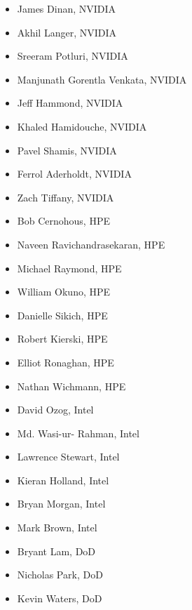 \begin{multicols}{2}
\begin{itemize}
\item James Dinan\footnotemark[1], NVIDIA                  %
\item Akhil Langer, NVIDIA                                 %
\item Sreeram Potluri, NVIDIA                              %
\item Manjunath Gorentla Venkata\footnotemark[10], NVIDIA  %
\item Jeff Hammond, NVIDIA                                 %
\item Khaled Hamidouche, NVIDIA                            %
\item Pavel Shamis, NVIDIA                                 %
\item Ferrol Aderholdt, NVIDIA                             %
\item Zach Tiffany, NVIDIA                                 %

\item Bob Cernohous, \ac{HPE}                              %
\item Naveen Ravichandrasekaran\footnotemark[9], \ac{HPE}  %
\item Michael Raymond, \ac{HPE}                            %
\item William Okuno\footnotemark[2], \ac{HPE}              %
\item Danielle Sikich, \ac{HPE}                            %
\item Robert Kierski, \ac{HPE}                             %
\item Elliot Ronaghan\footnotemark[8], \ac{HPE}            %
\item Nathan Wichmann, \ac{HPE}                            %

\item David Ozog\footnotemark[5], Intel                    %
\item Md. Wasi-ur- Rahman\footnotemark[11], Intel          %
\item Lawrence Stewart\footnotemark[7], Intel              %
\item Kieran Holland, Intel                                %
\item Bryan Morgan, Intel                                  %
\item Mark Brown, Intel                                    %

\item Bryant Lam, \ac{DoD}                                 %
\item Nicholas Park, \ac{DoD}                              %
\item Kevin Waters\footnotemark[3], \ac{DoD}               %


\end{itemize}
\end{multicols}

